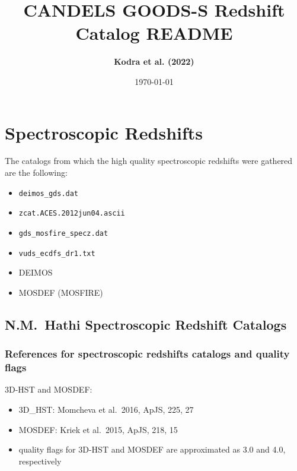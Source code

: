 \documentclass[12pt,onecolumn]{article}
\title{\textbf{CANDELS GOODS-S Redshift Catalog README}}
\author{\textbf{Kodra et al. (2022)}}
\date{\today}
\begin{document}
\maketitle





\section*{Spectroscopic Redshifts}

The catalogs from which the high quality spectroscopic redshifts were gathered are the following:
\begin{itemize}
\item \texttt{deimos\_gds.dat}
\item \texttt{zcat.ACES.2012jun04.ascii}
\item \texttt{gds\_mosfire\_specz.dat}
\item \texttt{vuds\_ecdfs\_dr1.txt}
\item DEIMOS
\item MOSDEF (MOSFIRE)
\end{itemize}

\subsection*{N.M.~Hathi Spectroscopic Redshift Catalogs}
\subsubsection*{References for spectroscopic redshifts catalogs and quality flags}

\noindent 3D-HST and MOSDEF:
\begin{itemize}
\item 3D\_HST: Momcheva et al.\ 2016, ApJS, 225, 27
\item MOSDEF: Kriek et al.\ 2015, ApJS, 218, 15
\item quality flags for 3D-HST and MOSDEF are approximated as 3.0 and 4.0, respectively
\end{itemize}
\end{document}
